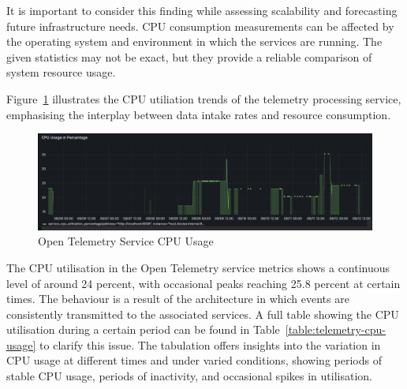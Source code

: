 \documentclass[journal]{IEEEtran}
\begin{document}
It is important to consider this finding while assessing scalability and forecasting future infrastructure needs. CPU consumption measurements can be affected by the operating system and environment in which the services are running. The given statistics may not be exact, but they provide a reliable comparison of system resource usage.

Figure~\ref{openTelemetryServiceCpuUsage} illustrates the CPU utiliation trends of the telemetry processing service, emphasising the interplay between data intake rates and resource consumption.

\begin{figure}[h]
    \centering
    \includegraphics[width=\textwidth]{images/Open-telemetry-service-CPU-usage.png}
    \caption{Open Telemetry Service CPU Usage}
    \label{openTelemetryServiceCpuUsage}
\end{figure}

The CPU utilisation in the Open Telemetry service metrics shows a continuous level of around 24 percent, with occasional peaks reaching 25.8 percent at certain times. The behaviour is a result of the architecture in which events are consistently transmitted to the associated services. A full table showing the CPU utilisation during a certain period can be found in Table~\ref{table:telemetry-cpu-usage} to clarify this issue. The tabulation offers insights into the variation in CPU usage at different times and under varied conditions, showing periods of stable CPU usage, periods of inactivity, and occasional spikes in utilisation.
\end{document}
